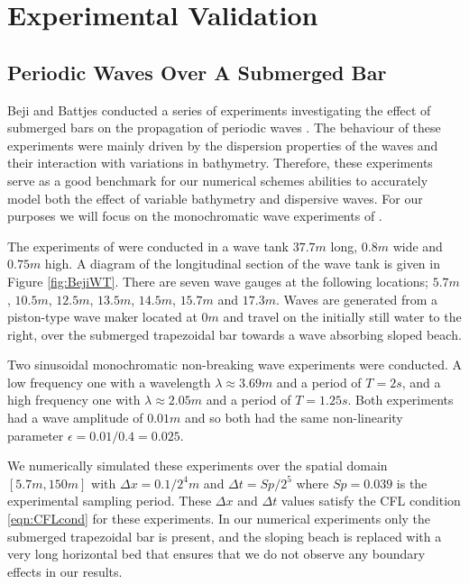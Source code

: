 
\chapter{Experimental Validation}
\label{chp:ExpMethodComp}



\section{Periodic Waves Over A Submerged Bar}
Beji and Battjes conducted a series of experiments investigating the effect of submerged bars on the propagation of periodic waves \cite{Beji-Battjes-1993-151,Beji-Battjes-1994-1}. The behaviour of these experiments were mainly driven by the dispersion properties of the waves and their interaction with variations in bathymetry. Therefore, these experiments serve as a good benchmark for our numerical schemes abilities to accurately model both the effect of variable bathymetry and dispersive waves. For our purposes we will focus on the monochromatic wave experiments of \citet{Beji-Battjes-1994-1}.

The experiments of \citet{Beji-Battjes-1994-1} were conducted in a wave tank $37.7m$ long, $0.8m$ wide and $0.75m$ high. A diagram of the longitudinal section of the wave tank is given in Figure \ref{fig:BejiWT}. There are seven wave gauges at the following locations; $5.7m$, $10.5m$, $12.5m$, $13.5m$, $14.5m$, $15.7m$ and $17.3m$. Waves are generated from a piston-type wave maker located at $0m$ and travel on the initially still water to the right, over the submerged trapezoidal bar towards a wave absorbing sloped beach.

Two sinusoidal monochromatic non-breaking wave experiments were conducted. A low frequency one with a wavelength $\lambda \approx 3.69m$ and a period of $T = 2s$, and a high frequency one with $\lambda \approx 2.05m$ and a period of $T = 1.25s$. Both experiments had a wave amplitude of $0.01m$ and so both had the same non-linearity parameter $\epsilon = 0.01 / 0.4 = 0.025$. 

We numerically simulated these experiments over the spatial domain $\left[5.7m,150m\right]$ with $\Delta x = 0.1 / 2^4 m$ and $\Delta t = Sp / 2^5$ where $Sp = 0.039$ is the experimental sampling period. These $\Delta x$ and $\Delta t$ values satisfy the CFL condition \eqref{eqn:CFLcond} for these experiments. In our numerical experiments only the submerged trapezoidal bar is present, and the sloping beach is replaced with a very long horizontal bed that ensures that we do not observe any boundary effects in our results.  

